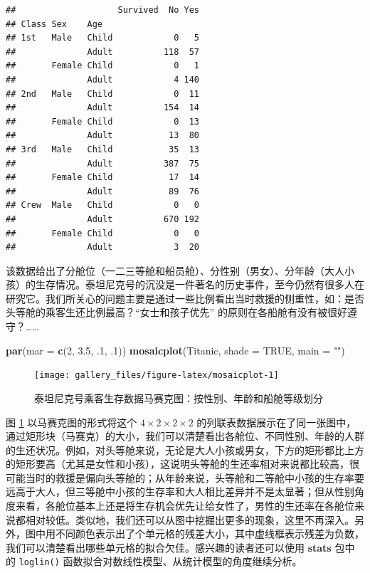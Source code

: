 \documentclass[
  b5paper,
  UTF8,twoside]{book}
\newenvironment{Shaded}{\begin{snugshade}}{\end{snugshade}}
\newcommand{\AttributeTok}[1]{\textcolor[rgb]{0.13,0.29,0.53}{#1}}
\newcommand{\ConstantTok}[1]{\textcolor[rgb]{0.56,0.35,0.01}{#1}}
\newcommand{\DecValTok}[1]{\textcolor[rgb]{0.00,0.00,0.81}{#1}}
\newcommand{\FloatTok}[1]{\textcolor[rgb]{0.00,0.00,0.81}{#1}}
\newcommand{\FunctionTok}[1]{\textcolor[rgb]{0.13,0.29,0.53}{\textbf{#1}}}
\newcommand{\NormalTok}[1]{#1}
\newcommand{\StringTok}[1]{\textcolor[rgb]{0.31,0.60,0.02}{#1}}
\begin{document}
\begin{verbatim}
##                    Survived  No Yes
## Class Sex    Age                   
## 1st   Male   Child            0   5
##              Adult          118  57
##       Female Child            0   1
##              Adult            4 140
## 2nd   Male   Child            0  11
##              Adult          154  14
##       Female Child            0  13
##              Adult           13  80
## 3rd   Male   Child           35  13
##              Adult          387  75
##       Female Child           17  14
##              Adult           89  76
## Crew  Male   Child            0   0
##              Adult          670 192
##       Female Child            0   0
##              Adult            3  20
\end{verbatim}

该数据给出了分舱位（一二三等舱和船员舱）、分性别（男女）、分年龄（大人小孩）的生存情况。泰坦尼克号的沉没是一件著名的历史事件，至今仍然有很多人在研究它。我们所关心的问题主要是通过一些比例看出当时救援的侧重性，如：是否头等舱的乘客生还比例最高？``女士和孩子优先'' 的原则在各船舱有没有被很好遵守？\ldots\ldots{}





\begin{Shaded}
\begin{Highlighting}[]
\FunctionTok{par}\NormalTok{(}\AttributeTok{mar =} \FunctionTok{c}\NormalTok{(}\DecValTok{2}\NormalTok{, }\FloatTok{3.5}\NormalTok{, .}\DecValTok{1}\NormalTok{, .}\DecValTok{1}\NormalTok{))}
\FunctionTok{mosaicplot}\NormalTok{(Titanic, }\AttributeTok{shade =} \ConstantTok{TRUE}\NormalTok{, }\AttributeTok{main =} \StringTok{""}\NormalTok{)}
\end{Highlighting}
\end{Shaded}

\begin{figure}

{\centering \texttt{[image: gallery\_files/figure-latex/mosaicplot-1]} 

}

\caption[泰坦尼克号乘客生存数据马赛克图]{泰坦尼克号乘客生存数据马赛克图：按性别、年龄和船舱等级划分}\label{fig:mosaicplot}
\end{figure}

图 \ref{fig:mosaicplot} 以马赛克图的形式将这个 \(4\times2\times2\times2\) 的列联表数据展示在了同一张图中，通过矩形块（马赛克）的大小，我们可以清楚看出各舱位、不同性别、年龄的人群的生还状况。例如，对头等舱来说，无论是大人小孩或男女，下方的矩形都比上方的矩形要高（尤其是女性和小孩），这说明头等舱的生还率相对来说都比较高，很可能当时的救援是偏向头等舱的；从年龄来说，头等舱和二等舱中小孩的生存率要远高于大人，但三等舱中小孩的生存率和大人相比差异并不是太显著；但从性别角度来看，各舱位基本上还是将生存机会优先让给女性了，男性的生还率在各舱位来说都相对较低。类似地，我们还可以从图中挖掘出更多的现象，这里不再深入。另外，图中用不同颜色表示出了个单元格的残差大小，其中虚线框表示残差为负数，我们可以清楚看出哪些单元格的拟合欠佳。感兴趣的读者还可以使用 \textbf{stats} 包中的 \texttt{loglin()} 函数拟合对数线性模型、从统计模型的角度继续分析。
\end{document}
